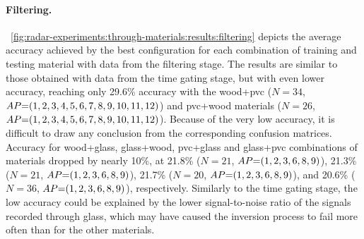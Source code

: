 \paragraph{Filtering.}
\fig~\ref{fig:radar-experiments:through-materials:results:filtering} depicts the average accuracy achieved by the best configuration for each combination of training and testing material with data from the filtering stage.
The results are similar to those obtained with data from the time gating stage, but with even lower accuracy, reaching only 29.6\% accuracy with the wood+pvc ($N{=}34$, $\splitatcommas{AP{=}(1, 2, 3, 4, 5, 6, 7, 8, 9, 10, 11, 12)}$) and pvc+wood materials ($N{=}26$, $\splitatcommas{AP{=}(1, 2, 3, 4, 5, 6, 7, 8, 9, 10, 11, 12)}$).
%
Because of the very low accuracy, it is difficult to draw any conclusion from the corresponding confusion matrices.
Accuracy for wood+glass, glass+wood, pvc+glass and glass+pvc combinations of materials dropped by nearly 10\%, at 21.8\% ($N{=}21$, $\splitatcommas{AP{=}(1, 2, 3, 6, 8, 9)}$), 21.3\% ($N{=}21$, $\splitatcommas{AP{=}(1, 2, 3, 6, 8, 9)}$), 21.7\% ($N{=}20$, $\splitatcommas{AP{=}(1, 2, 3, 6, 8, 9)}$), and 20.6\% ($N{=}36$, $\splitatcommas{AP{=}(1, 2, 3, 6, 8, 9)}$), respectively.
%
Similarly to the time gating stage, the low accuracy could be explained by the lower signal-to-noise ratio of the signals recorded through glass, which may have caused the inversion process to fail more often than for the other materials.


